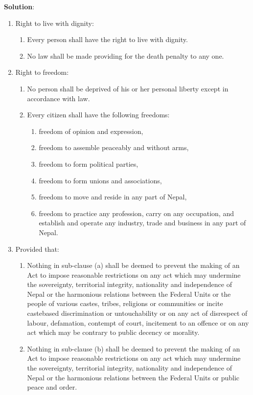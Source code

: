 \documentclass[
]{book}
\newenvironment{solution}{ {\bfseries Solution}:}{}
\begin{document}
\begin{questions}
\begin{solution}
\begin{enumerate}
\addtocounter{enumiii}{16} %
\item Right to live with dignity:
\begin{enumerate}
\item Every person shall have the right to live with dignity.
\item No law shall be made providing for the death penalty to any one.
\end{enumerate}
\item Right to freedom:
\begin{enumerate}
\item No person shall be deprived of his or her personal liberty except in accordance with law.
\item Every citizen shall have the following freedoms:
\begin{enumerate}
\item freedom of opinion and expression,
\item freedom to assemble peaceably and without arms,
\item freedom to form political parties,
\item freedom to form unions and associations,
\item freedom to move and reside in any part of Nepal,
\item freedom to practice any profession, carry on any occupation, and establish and operate any industry, trade and business in any part of Nepal.
\end{enumerate}
\end{enumerate}
\item[] Provided that:
\begin{enumerate}
\item Nothing in sub-clause (a) shall be deemed to prevent the making of an Act to impose reasonable restrictions on any act which may undermine the sovereignty, territorial integrity, nationality and independence of Nepal or the harmonious relations between the Federal Units or the people of various castes, tribes, religions or communities or incite castebased discrimination or untouchability or on any act of disrespect of labour, defamation, contempt of court, incitement to an offence or on any act which may be contrary to public decency or morality.
\item Nothing in sub-clause (b) shall be deemed to prevent the making of an Act to impose reasonable restrictions on any act which may undermine the sovereignty, territorial integrity, nationality and independence of Nepal or the harmonious relations between the Federal Units or public peace and order.

\end{enumerate}
\end{enumerate}
\end{solution}
\end{questions}
\end{document}
